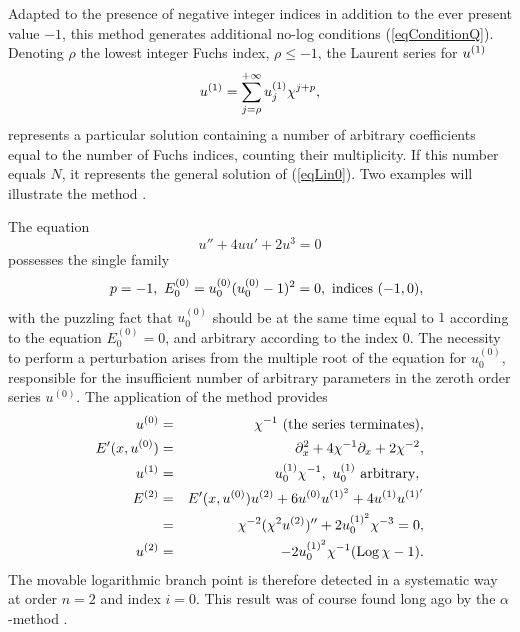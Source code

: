 \documentclass[10pt]{article}
\begin{document}
Adapted to the presence of negative integer indices
in addition to the ever present value $-1$,
this method \cite{FP1991,CFP1993}
generates additional no-log conditions (\ref{eqConditionQ}).
Denoting $\rho$ the lowest integer Fuchs index, $\rho \le -1$,
the Laurent series for ${ u}^{(1)}$
\begin{equation}
 { u}^{(1)}=\sum_{j=\rho}^{+ \infty} { u}^{(1)}_j \chi^{j+{ p}},
\label{eqMethodPerturbative7}
\end{equation}
represents a particular solution containing a number of arbitrary coefficients
equal to the number of Fuchs indices, counting their multiplicity.
If this number equals $N$, it represents the general solution of
(\ref{eqLin0}).
Two examples will illustrate the method
\cite[\S 5.7.3]{Cargese1996Conte}.

The equation
\begin{equation}
u''+4 u u' + 2 u^3=0
\label{eqOrder2WithLog}
\label{eqdoublefamily}
\end{equation}
possesses the single family
\begin{eqnarray}
& &
p=-1,\
E_0^{(0)}= u_0^{(0)} (u_0^{(0)}-1)^2=0,\
\hbox{indices } (-1,0),
\end{eqnarray}
with the puzzling fact that $u_0^{(0)}$ should be at the same time 
equal to $1$ according to the equation $E_0^{(0)}=0$,
and arbitrary according to the index $0$.
The necessity to perform a perturbation arises from the multiple root
of the equation for $u_0^{(0)}$,
responsible for the insufficient number of arbitrary parameters in
the zeroth order series $u^{(0)}$.
The application of the method provides
\begin{eqnarray}
u^{(0)}
& = & 
\chi^{-1} \hbox{ (the series terminates)},
\\
E'(x,u^{(0)}) 
& = &
\partial_x^2 + 4 \chi^{-1} \partial_x + 2 \chi^{-2},
\\
u^{(1)}
& = &
u_{0}^{(1)} \chi^{-1},\
u_{0}^{(1)} \hbox{ arbitrary},\
\\
E^{(2)}
& = &
E'(x,u^{(0)}) u^{(2)} + 6 u^{(0)} u^{(1)^2} + 4 u^{(1)} u^{(1)'}
\nonumber
\\
& = &
\chi^{-2} (\chi^2 u^{(2)})'' + 2 u_0^{(1)^2} \chi^{-3}
=0,
\\
u^{(2)}
& = &
- 2 u_{0}^{(1)^2} \chi^{-1} (\mathop{\rm Log}\nolimits \chi - 1).
\end{eqnarray}
The movable logarithmic branch point is therefore detected in a systematic way
at order $n=2$ and index $i=0$.
This result was of course found long ago 
by the $\alpha$-method \cite[\S 13, p 221]{PaiBSMF}.
\end{document}
